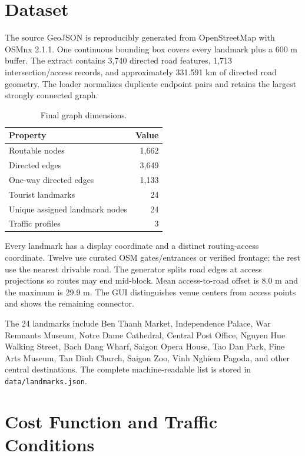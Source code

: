 \documentclass[12pt,a4paper]{article}
\begin{document}
\section{Dataset}

The source GeoJSON is reproducibly generated from OpenStreetMap with OSMnx
2.1.1. One continuous bounding box covers every landmark plus a 600 m buffer.
The extract contains 3,740 directed road features, 1,713 intersection/access
records, and approximately 331.591 km of directed road geometry. The loader
normalizes duplicate endpoint pairs and retains the largest strongly connected
graph.

\begin{table}[H]
    \centering
    \caption{Final graph dimensions.}
    \label{tab:graph-size}
    \renewcommand{\arraystretch}{1.15}
    \begin{tabular}{lr}
        \toprule
        \textbf{Property} & \textbf{Value} \\
        \midrule
        Routable nodes & 1,662 \\
        Directed edges & 3,649 \\
        One-way directed edges & 1,133 \\
        Tourist landmarks & 24 \\
        Unique assigned landmark nodes & 24 \\
        Traffic profiles & 3 \\
        \bottomrule
    \end{tabular}
\end{table}

Every landmark has a display coordinate and a distinct routing-access
coordinate. Twelve use curated OSM gates/entrances or verified frontage; the
rest use the nearest drivable road. The generator splits road edges at access
projections so routes may end mid-block. Mean access-to-road offset is 8.0 m
and the maximum is 29.9 m. The GUI distinguishes venue centers from access
points and shows the remaining connector.

The 24 landmarks include Ben Thanh Market, Independence Palace, War Remnants
Museum, Notre Dame Cathedral, Central Post Office, Nguyen Hue Walking Street,
Bach Dang Wharf, Saigon Opera House, Tao Dan Park, Fine Arts Museum, Tan Dinh
Church, Saigon Zoo, Vinh Nghiem Pagoda, and other central destinations. The
complete machine-readable list is stored in \texttt{data/landmarks.json}.

\section{Cost Function and Traffic Conditions}
\end{document}

